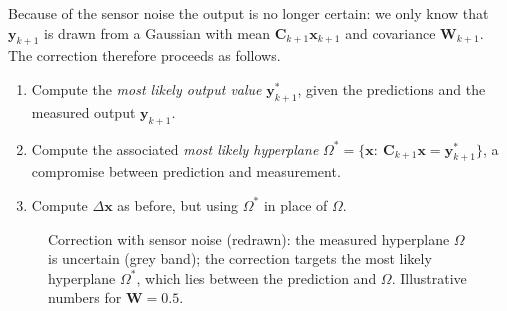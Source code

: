 \documentclass[11pt,a4paper]{article}
\newcommand{\hx}{\hat{\boldsymbol{x}}}
\newcommand{\bx}{\boldsymbol{x}}
\newcommand{\by}{\boldsymbol{y}}
\newcommand{\mC}{\mathbf{C}}
\newcommand{\mW}{\mathbf{W}}
\theoremstyle{plain}
\theoremstyle{definition}
\theoremstyle{remark}
\begin{document}
Because of the sensor noise the output is no longer certain: we only know that $\by_{k+1}$ is drawn from a Gaussian with mean
$\mC_{k+1}\bx_{k+1}$ and covariance $\mW_{k+1}$. The correction therefore proceeds as follows.
\begin{enumerate}
\item Compute the \emph{most likely output value} $\by^*_{k+1}$, given the predictions and the measured output $\by_{k+1}$.
\item Compute the associated \emph{most likely hyperplane} $\Omega^*=\{\bx:\ \mC_{k+1}\bx=\by^*_{k+1}\}$, a compromise between prediction and measurement.
\item Compute $\Delta\bx$ as before, but using $\Omega^*$ in place of $\Omega$.
\end{enumerate}

\begin{figure}[H]
\centering
{}
\caption{Correction with sensor noise (redrawn): the measured hyperplane $\Omega$ is uncertain (grey band); the correction targets the most
likely hyperplane $\Omega^*$, which lies between the prediction and $\Omega$. Illustrative numbers for $\mW=0.5$.}\label{fig:omegastar}
\end{figure}
\end{document}
